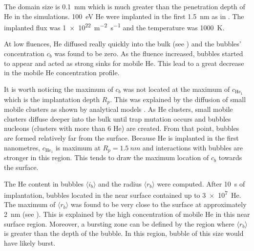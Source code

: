 The domain size is \SI{0.1}{mm} which is much greater than the penetration depth of \gls{He} in the simulations.
\SI{100}{eV} \gls{He} were implanted in the first \SI{1.5}{nm} as in .
The implanted flux was \SI{1e22}{m^{-2} s^{-1}} and the temperature was \SI{1000}{K}.

At low \glspl{fluence}, \gls{He} diffused really quickly into the bulk (see ) and the bubbles' concentration $c_b$ was found to be zero.
As the \gls{fluence} increased, bubbles started to appear and acted as strong sinks for mobile \gls{He}.
This lead to a great decrease in the mobile He concentration profile.

It is worth noticing the maximum of $c_b$ was not located at the maximum of $c_{\mathrm{He}_1}$ which is the implantation depth $R_p$.
This was explained by the \gls{diffusion} of small mobile clusters as shown by analytical models .
As \gls{He} clusters, small mobile clusters diffuse deeper into the bulk until \gls{trap mutation} occurs and bubbles nucleons (clusters with more than 6 \gls{He}) are created.
From that point, bubbles are formed relatively far from the surface.
Because \gls{He} is implanted in the first nanometres, $c_{\mathrm{He}_1}$ is maximum at $R_p = \SI{1.5}{nm}$ and interactions with bubbles are stronger in this region.
This tends to draw the maximum location of $c_b$ towards the surface.

The \gls{He} content in bubbles $\langle i_b \rangle$ and the radius $\langle r_b \rangle$ were computed.
After \SI{10}{s} of implantation, bubbles located in the near surface contained up to \SI{3e7}{He}.
The maximum of $\langle r_b \rangle$ was found to be very close to the surface at approximately \SI{2}{nm} (see ).
This is explained by the high concentration of mobile \gls{He} in this near surface region.
Moreover, a bursting zone can be defined by the region where $\langle r_b \rangle$ is greater than the depth of the bubble.
In this region, bubble of this size would have likely burst.

